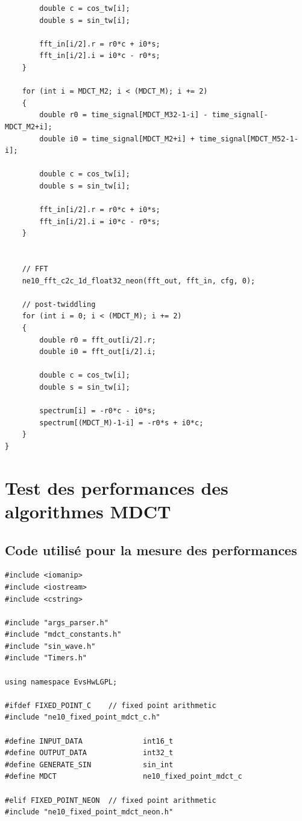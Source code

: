 \documentclass{article}
\begin{document}
\begin{appendix}
\begin{lstlisting}
        double c = cos_tw[i];
        double s = sin_tw[i];

        fft_in[i/2].r = r0*c + i0*s;
        fft_in[i/2].i = i0*c - r0*s;
    }

    for (int i = MDCT_M2; i < (MDCT_M); i += 2)
    {
        double r0 = time_signal[MDCT_M32-1-i] - time_signal[-MDCT_M2+i];
        double i0 = time_signal[MDCT_M2+i] + time_signal[MDCT_M52-1-i];

        double c = cos_tw[i];
        double s = sin_tw[i];

        fft_in[i/2].r = r0*c + i0*s;
        fft_in[i/2].i = i0*c - r0*s;
    }


    // FFT
    ne10_fft_c2c_1d_float32_neon(fft_out, fft_in, cfg, 0);

    // post-twiddling
    for (int i = 0; i < (MDCT_M); i += 2)
    {
        double r0 = fft_out[i/2].r;
        double i0 = fft_out[i/2].i;

        double c = cos_tw[i];
        double s = sin_tw[i];

        spectrum[i] = -r0*c - i0*s;
        spectrum[(MDCT_M)-1-i] = -r0*s + i0*c;
    }
}
        \end{lstlisting}





        \section{Test des performances des algorithmes MDCT}
        \subsection{Code utilisé pour la mesure des performances}
        \label{an:run_mdcts}
        \begin{lstlisting}
#include <iomanip>
#include <iostream>
#include <cstring>

#include "args_parser.h"
#include "mdct_constants.h"
#include "sin_wave.h"
#include "Timers.h"

using namespace EvsHwLGPL;

#ifdef FIXED_POINT_C    // fixed point arithmetic
#include "ne10_fixed_point_mdct_c.h"

#define INPUT_DATA              int16_t
#define OUTPUT_DATA             int32_t
#define GENERATE_SIN            sin_int
#define MDCT                    ne10_fixed_point_mdct_c

#elif FIXED_POINT_NEON  // fixed point arithmetic
#include "ne10_fixed_point_mdct_neon.h"


\end{lstlisting}
\end{appendix}
\end{document}
